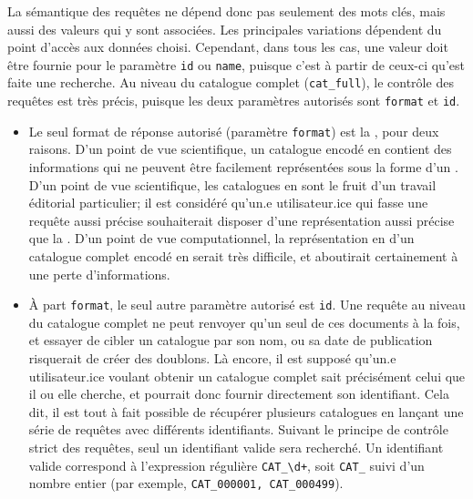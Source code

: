 La sémantique des requêtes ne dépend donc pas seulement des mots clés, mais aussi des valeurs qui y sont associées. Les principales variations dépendent du point d'accès aux données choisi. Cependant, dans tous les cas, une valeur doit être fournie pour le paramètre \texttt{id} ou \texttt{name}, puisque c'est à partir de ceux-ci qu'est faite une recherche. Au niveau du catalogue complet (\texttt{cat\_full}), le contrôle des requêtes est très précis, puisque les deux paramètres autorisés sont \texttt{format} et \texttt{id}.
\begin{itemize}
	\item Le seul format de réponse autorisé (paramètre \texttt{format}) est la \tei{}, pour deux raisons. D'un point de vue scientifique, un catalogue encodé en \tei{} contient des informations qui ne peuvent être facilement représentées sous la forme d'un \json{}. D'un point de vue scientifique, les catalogues en \tei{} sont le fruit d'un travail éditorial particulier; il est considéré qu'un.e utilisateur.ice qui fasse une requête aussi précise souhaiterait disposer d'une représentation aussi précise que la \tei{}. D'un point de vue computationnel, la représentation en \json{} d'un catalogue complet encodé en \tei{} serait très difficile, et aboutirait certainement à une perte d'informations.
	\item À part \texttt{format}, le seul autre paramètre autorisé est \texttt{id}. Une requête au niveau du catalogue complet ne peut renvoyer qu'un seul de ces documents à la fois, et essayer de cibler un catalogue par son nom, ou sa date de publication risquerait de créer des doublons. Là encore, il est supposé qu'un.e utilisateur.ice voulant obtenir un catalogue complet sait précisément celui que il ou elle cherche, et pourrait donc fournir directement son identifiant. Cela dit, il est tout à fait possible de récupérer plusieurs catalogues en lançant une série de requêtes avec différents identifiants. Suivant le principe de contrôle strict des requêtes, seul un identifiant valide sera recherché. Un identifiant valide correspond à l'expression régulière \texttt{CAT\_\textbackslash{}d+}, soit \texttt{CAT\_} suivi d'un nombre entier (par exemple, \texttt{CAT\_000001, CAT\_000499}).
\end{itemize}

